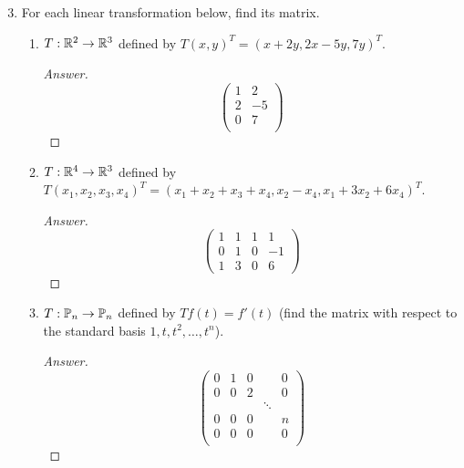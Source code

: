 \documentclass[../psets.tex]{subfiles}
\begin{document}
\begin{enumerate}[label={\textbf{3.\arabic*.}}]
    \setcounter{enumi}{2}
    \item For each linear transformation below, find its matrix.
    \begin{enumerate}
        \item $T:\mathbb{R}^2\to\mathbb{R}^3$ defined by $T(x,y)^T=(x+2y,2x-5y,7y)^T$.
        \begin{proof}[Answer]
            \begin{equation*}
                \begin{pmatrix}
                    1 & 2\\
                    2 & -5\\
                    0 & 7\\
                \end{pmatrix}
            \end{equation*}
        \end{proof}
        \item $T:\mathbb{R}^4\to\mathbb{R}^3$ defined by $T(x_1,x_2,x_3,x_4)^T=(x_1+x_2+x_3+x_4,x_2-x_4,x_1+3x_2+6x_4)^T$.
        \begin{proof}[Answer]
            \begin{equation*}
                \begin{pmatrix}
                    1 & 1 & 1 & 1\\
                    0 & 1 & 0 & -1\\
                    1 & 3 & 0 & 6
                \end{pmatrix}
            \end{equation*}
        \end{proof}
        \item $T:\mathbb{P}_n\to\mathbb{P}_n$ defined by $Tf(t)=f'(t)$ (find the matrix with respect to the standard basis $1,t,t^2,\dots,t^n$).
        \begin{proof}[Answer]
            \begin{equation*}
                \begin{pmatrix}
                    0 & 1 & 0 &        & 0\\
                    0 & 0 & 2 &        & 0\\
                      &   &   & \ddots &  \\
                    0 & 0 & 0 &        & n\\
                    0 & 0 & 0 &        & 0\\
                \end{pmatrix}

\end{equation*}
\end{proof}
\end{enumerate}
\end{enumerate}
\end{document}
